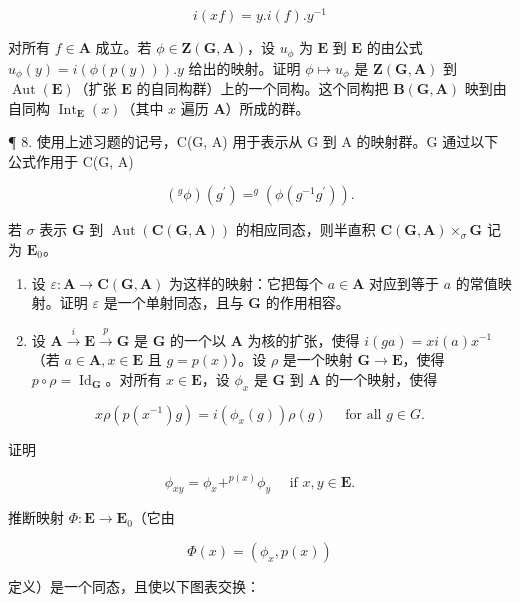 \[
i (x f) = y. i (f). y ^ {- 1}
\]

对所有 \(f \in \mathbf{A}\) 成立。若 \(\phi \in \mathbf{Z}(\mathbf{G}, \mathbf{A})\)，设 \(u_{\phi}\) 为 \(\mathbf{E}\) 到 \(\mathbf{E}\) 的由公式 \(u_{\phi}(y) = i(\phi(p(y))) .y\) 给出的映射。证明 \(\phi \mapsto u_{\phi}\) 是 \(\mathbf{Z}(\mathbf{G}, \mathbf{A})\) 到 \(\operatorname{Aut}(\mathbf{E})\)（扩张 \(\mathbf{E}\) 的自同构群）上的一个同构。这个同构把 \(\mathbf{B}(\mathbf{G}, \mathbf{A})\) 映到由自同构 \(\operatorname{Int}_{\mathbf{E}}(x)\)（其中 \(x\) 遍历 \(\mathbf{A}\)）所成的群。

¶ 8. 使用上述习题的记号，C(G, A) 用于表示从 G 到 A 的映射群。G 通过以下公式作用于 C(G, A)

\[
\left(^ {g} \phi\right) \left(g ^ {\prime}\right) = ^ {g} \left(\phi \left(g ^ {- 1} g ^ {\prime}\right)\right).
\]

若 \(\sigma\) 表示 \(\mathbf{G}\) 到 \(\operatorname{Aut}(\mathbf{C}(\mathbf{G},\mathbf{A}))\) 的相应同态，则半直积 \(\mathbf{C}(\mathbf{G},\mathbf{A}) \times_{\sigma} \mathbf{G}\) 记为 \(\mathbf{E}_0\)。

\begin{enumerate}
\def\labelenumi{(\alph{enumi})}
\item
  设 \(\varepsilon: \mathbf{A} \to \mathbf{C}(\mathbf{G}, \mathbf{A})\) 为这样的映射：它把每个 \(a \in \mathbf{A}\) 对应到等于 \(a\) 的常值映射。证明 \(\varepsilon\) 是一个单射同态，且与 \(\mathbf{G}\) 的作用相容。
\item
  设 \(\mathbf{A} \xrightarrow{i} \mathbf{E} \xrightarrow{p} \mathbf{G}\) 是 \(\mathbf{G}\) 的一个以 \(\mathbf{A}\) 为核的扩张，使得 \(i(ga) = xi(a)x^{-1}\)（若 \(a \in \mathbf{A}, x \in \mathbf{E}\) 且 \(g = p(x)\)）。设 \(\rho\) 是一个映射 \(\mathbf{G} \to \mathbf{E}\)，使得 \(p \circ \rho = \operatorname{Id}_{\mathbf{G}}\)。对所有 \(x \in \mathbf{E}\)，设 \(\phi_x\) 是 \(\mathbf{G}\) 到 \(\mathbf{A}\) 的一个映射，使得
\end{enumerate}

\[
x \rho (p (x ^ {- 1}) g) = i (\phi_ {x} (g)) \rho (g) \quad \text { for   all } g \in G.
\]

证明

\[
\phi_ {x y} = \phi_ {x} + ^ {p (x)} \phi_ {y} \quad \text { if } x, y \in \mathbf {E}.
\]

推断映射 \(\Phi: \mathbf{E} \to \mathbf{E}_0\)（它由

\[
\Phi (x) = (\phi_ {x}, p (x))
\]

定义）是一个同态，且使以下图表交换：

